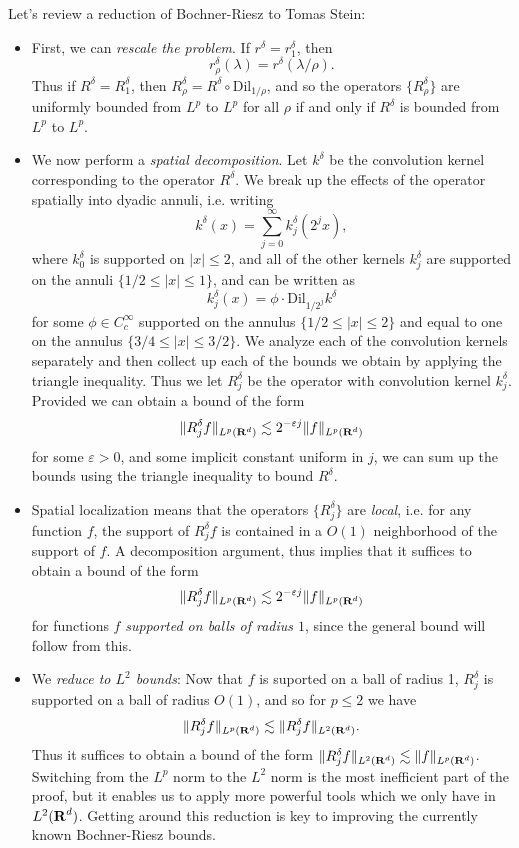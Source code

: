 Let's review a reduction of Bochner-Riesz to Tomas Stein:
%
\begin{itemize}
    \item First, we can \emph{rescale the problem}. If $r^\delta = r^\delta_1$, then
    \[ r_\rho^\delta(\lambda) = r^\delta(\lambda / \rho). \]
    Thus if $R^\delta = R^\delta_1$, then $R^\delta_\rho = R^\delta \circ \text{Dil}_{1/\rho}$, and so the operators $\{ R^\delta_\rho \}$ are uniformly bounded from $L^p$ to $L^p$ for all $\rho$ if and only if $R^\delta$ is bounded from $L^p$ to $L^p$.

    \item We now perform a \emph{spatial decomposition}. Let $k^\delta$ be the convolution kernel corresponding to the operator $R^\delta$. We break up the effects of the operator spatially into dyadic annuli, i.e. writing
    \[ k^\delta(x) = \sum_{j = 0}^\infty k^\delta_j(2^j x), \]
    where $k^\delta_0$ is supported on $|x| \leq 2$, and all of the other kernels $k^\delta_j$ are supported on the annuli $\{ 1/2 \leq |x| \leq 1 \}$, and can be written as
    \[ k^\delta_j(x) = \phi \cdot \text{Dil}_{1/2^j} k^\delta \]
    for some $\phi \in C_c^\infty$ supported on the annulus $\{ 1/2 \leq |x| \leq 2 \}$ and equal to one on the annulus $\{ 3/4 \leq |x| \leq 3/2 \}$. We analyze each of the convolution kernels separately and then collect up each of the bounds we obtain by applying the triangle inequality. Thus we let $R^\delta_j$ be the operator with convolution kernel $k^\delta_j$. Provided we can obtain a bound of the form
    \[ \| R^\delta_j f \|_{L^p(\operatorname{\mathbf{R}}^d)} \lesssim 2^{- \varepsilon j} \| f \|_{L^p(\operatorname{\mathbf{R}}^d)} \]
    for some $\varepsilon > 0$, and some implicit constant uniform in $j$, we can sum up the bounds using the triangle inequality to bound $R^\delta$.

    \item Spatial localization means that the operators $\{ R^\delta_j \}$ are \emph{local}, i.e. for any function $f$, the support of $R^\delta_j f$ is contained in a $O(1)$ neighborhood of the support of $f$. A decomposition argument, thus implies that it suffices to obtain a bound of the form
    \[ \| R^\delta_j f \|_{L^p(\operatorname{\mathbf{R}}^d)} \lesssim 2^{- \varepsilon j} \| f \|_{L^p(\operatorname{\mathbf{R}}^d)} \]
    for functions $f$ \emph{supported on balls of radius $1$}, since the general bound will follow from this.

    \item We \emph{reduce to $L^2$ bounds}: Now that $f$ is suported on a ball of radius 1, $R^\delta_j$ is supported on a ball of radius $O(1)$, and so for $p \leq 2$ we have
    \[ \| R^\delta_j f \|_{L^p(\operatorname{\mathbf{R}}^d)} \lesssim \| R^\delta_j f \|_{L^2(\operatorname{\mathbf{R}}^d)}. \]
    Thus it suffices to obtain a bound of the form $\| R^\delta_j f \|_{L^2(\operatorname{\mathbf{R}}^d)} \lesssim \| f \|_{L^p(\operatorname{\mathbf{R}}^d)}$. Switching from the $L^p$ norm to the $L^2$ norm is the most inefficient part of the proof, but it enables us to apply more powerful tools which we only have in $L^2(\operatorname{\mathbf{R}}^d)$. Getting around this reduction is key to improving the currently known Bochner-Riesz bounds.


\end{itemize}
